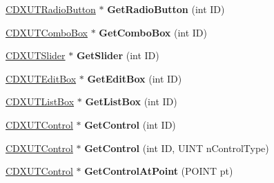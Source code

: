 \begin{DoxyCompactItemize}
\item 
\hypertarget{class_c_d_x_u_t_dialog_a346d360fc897ec736800dfcf86ca205c}{\hyperlink{class_c_d_x_u_t_radio_button}{C\+D\+X\+U\+T\+Radio\+Button} $\ast$ {\bfseries Get\+Radio\+Button} (int I\+D)}\label{class_c_d_x_u_t_dialog_a346d360fc897ec736800dfcf86ca205c}

\item 
\hypertarget{class_c_d_x_u_t_dialog_a2f11b9478861af81e40bebb3718a4ee3}{\hyperlink{class_c_d_x_u_t_combo_box}{C\+D\+X\+U\+T\+Combo\+Box} $\ast$ {\bfseries Get\+Combo\+Box} (int I\+D)}\label{class_c_d_x_u_t_dialog_a2f11b9478861af81e40bebb3718a4ee3}

\item 
\hypertarget{class_c_d_x_u_t_dialog_a9218f6cb171d1649cc49d487a3fa66da}{\hyperlink{class_c_d_x_u_t_slider}{C\+D\+X\+U\+T\+Slider} $\ast$ {\bfseries Get\+Slider} (int I\+D)}\label{class_c_d_x_u_t_dialog_a9218f6cb171d1649cc49d487a3fa66da}

\item 
\hypertarget{class_c_d_x_u_t_dialog_ad0e0333dfd921e371b1cfaf4aec674fe}{\hyperlink{class_c_d_x_u_t_edit_box}{C\+D\+X\+U\+T\+Edit\+Box} $\ast$ {\bfseries Get\+Edit\+Box} (int I\+D)}\label{class_c_d_x_u_t_dialog_ad0e0333dfd921e371b1cfaf4aec674fe}

\item 
\hypertarget{class_c_d_x_u_t_dialog_aab44b0aff12eb520b714fa7567ce1d14}{\hyperlink{class_c_d_x_u_t_list_box}{C\+D\+X\+U\+T\+List\+Box} $\ast$ {\bfseries Get\+List\+Box} (int I\+D)}\label{class_c_d_x_u_t_dialog_aab44b0aff12eb520b714fa7567ce1d14}

\item 
\hypertarget{class_c_d_x_u_t_dialog_ad65e23ac0ba4e4b5af0128f6518f09ae}{\hyperlink{class_c_d_x_u_t_control}{C\+D\+X\+U\+T\+Control} $\ast$ {\bfseries Get\+Control} (int I\+D)}\label{class_c_d_x_u_t_dialog_ad65e23ac0ba4e4b5af0128f6518f09ae}

\item 
\hypertarget{class_c_d_x_u_t_dialog_a7490e9cfec52ad62442c30c4f862b83a}{\hyperlink{class_c_d_x_u_t_control}{C\+D\+X\+U\+T\+Control} $\ast$ {\bfseries Get\+Control} (int I\+D, U\+I\+N\+T n\+Control\+Type)}\label{class_c_d_x_u_t_dialog_a7490e9cfec52ad62442c30c4f862b83a}

\item 
\hypertarget{class_c_d_x_u_t_dialog_a8d1c613d40be521ed5307446e33196e1}{\hyperlink{class_c_d_x_u_t_control}{C\+D\+X\+U\+T\+Control} $\ast$ {\bfseries Get\+Control\+At\+Point} (P\+O\+I\+N\+T pt)}\label{class_c_d_x_u_t_dialog_a8d1c613d40be521ed5307446e33196e1}


\end{DoxyCompactItemize}
